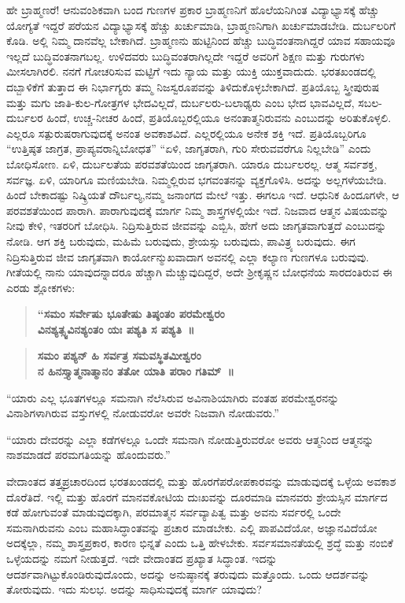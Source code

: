 ಹೇ ಬ್ರಾಹ್ಮಣರೆ! ಆನುವಂಶಿಕವಾಗಿ ಬಂದ ಗುಣಗಳ ಪ್ರಕಾರ ಬ್ರಾಹ್ಮಣನಿಗೆ ಹೊಲೆಯನಿಗಿಂತ ವಿದ್ಯಾಭ್ಯಾಸಕ್ಕೆ ಹೆಚ್ಚು ಯೋಗ್ಯತೆ ಇದ್ದರೆ ಪರೆಯನ ವಿದ್ಯಾಭ್ಯಾಸಕ್ಕೆ ಹೆಚ್ಚು ಖರ್ಚುಮಾಡಿ, ಬ್ರಾಹ್ಮಣನಿಗಾಗಿ ಖರ್ಚುಮಾಡಬೇಡಿ. ದುರ್ಬಲರಿಗೆ ಕೊಡಿ. ಅಲ್ಲಿ ನಿಮ್ಮ ದಾನವೆಲ್ಲ ಬೇಕಾಗಿದೆ. ಬ್ರಾಹ್ಮಣನು ಹುಟ್ಟಿನಿಂದ ಹೆಚ್ಚು ಬುದ್ಧಿವಂತನಾಗಿದ್ದರೆ ಯಾವ ಸಹಾಯವೂ ಇಲ್ಲದೆ ಬುದ್ಧಿವಂತನಾಗಬಲ್ಲ. ಉಳಿದವರು ಬುದ್ಧಿವಂತರಾಗಿಲ್ಲದೇ ಇದ್ದರೆ ಅವರಿಗೆ ಶಿಕ್ಷಣ ಮತ್ತು ಗುರುಗಳು ಮೀಸಲಾಗಿರಲಿ. ನನಗೆ ಗೋಚರಿಸುವ ಮಟ್ಟಿಗೆ ಇದು ನ್ಯಾಯ ಮತ್ತು ಯುಕ್ತಿ ಯುಕ್ತವಾದುದು. ಭರತಖಂಡದಲ್ಲಿ ದಬ್ಬಾಳಿಕೆಗೆ ತುತ್ತಾದ ಈ ನಿರ್ಭಾಗ್ಯರು ತಮ್ಮ ನಿಜಸ್ವರೂಪವನ್ನು ತಿಳಿದುಕೊಳ್ಳಬೇಕಾಗಿದೆ. ಪ್ರತಿಯೊಬ್ಬ ಸ್ತ್ರೀಪುರುಷ ಮತ್ತು ಮಗು ಜಾತಿ-ಕುಲ-ಗೋತ್ರಗಳ ಭೇದವಿಲ್ಲದೆ, ದುರ್ಬಲರು-ಬಲಾಢ್ಯರು ಎಂಬ ಭೇದ ಭಾವವಿಲ್ಲದೆ, ಸಬಲ-ದುರ್ಬಲರ ಹಿಂದೆ, ಉಚ್ಚ-ನೀಚರ ಹಿಂದೆ, ಪ್ರತಿಯೊಬ್ಬರಲ್ಲಿಯೂ ಅನಂತಾತ್ಮನಿರುವನು ಎಂಬುದನ್ನು ಅರಿತುಕೊಳ್ಳಲಿ. ಎಲ್ಲರೂ ಸತ್ಪುರುಷರಾಗುವುದಕ್ಕೆ ಅನಂತ ಅವಕಾಶವಿದೆ. ಎಲ್ಲರಲ್ಲಿಯೂ ಅನೇಕ ಶಕ್ತಿ ಇದೆ. ಪ್ರತಿಯೊಬ್ಬರಿಗೂ “ಉತ್ತಿಷ್ಠತ ಜಾಗ್ರತ, ಪ್ರಾಪ್ಯವರಾನ್ನಿಬೋಧತ” “ಏಳಿ, ಜಾಗೃತರಾಗಿ, ಗುರಿ ಸೇರುವವರೆಗೂ ನಿಲ್ಲಬೇಡಿ” ಎಂದು ಬೋಧಿಸೋಣ. ಏಳಿ, ದುರ್ಬಲತೆಯ ಪರವಶತೆಯಿಂದ ಜಾಗೃತರಾಗಿ. ಯಾರೂ ದುರ್ಬಲರಲ್ಲ. ಆತ್ಮ ಸರ್ವಶಕ್ತ, ಸರ್ವಜ್ಞ. ಏಳಿ, ಯಾರಿಗೂ ಮಣಿಯಬೇಡಿ. ನಿಮ್ಮಲ್ಲಿರುವ ಭಗವಂತನನ್ನು ವ್ಯಕ್ತಗೊಳಿಸಿ. ಅದನ್ನು ಅಲ್ಲಗಳೆಯಬೇಡಿ. ಹಿಂದೆ ಬೇಕಾದಷ್ಟು ನಿಷ್ಕ್ರಿಯತೆ ದೌರ್ಬಲ್ಯ,\break ನಮ್ಮ ಜನಾಂಗದ ಮೇಲೆ ಇತ್ತು. ಈಗಲೂ ಇದೆ. ಆಧುನಿಕ ಹಿಂದೂಗಳೇ, ಆ ಪರವಶತೆಯಿಂದ ಪಾರಾಗಿ. ಪಾರಾಗುವುದಕ್ಕೆ ಮಾರ್ಗ ನಿಮ್ಮ ಶಾಸ್ತ್ರಗಳಲ್ಲಿಯೇ ಇದೆ. ನಿಜವಾದ ಆತ್ಮನ ವಿಷಯವನ್ನು ನೀವು ಕೇಳಿ, ಇತರರಿಗೆ ಬೋಧಿಸಿ. ನಿದ್ರಿಸುತ್ತಿರುವ ಜೀವವನ್ನು ಎಬ್ಬಿಸಿ, ಹೇಗೆ ಅದು ಜಾಗೃತವಾಗುತ್ತದೆ ಎಂಬುದನ್ನು ನೋಡಿ. ಆಗ ಶಕ್ತಿ ಬರುವುದು, ಮಹಿಮೆ ಬರುವುದು, ಶ್ರೇಯಸ್ಸು ಬರುವುದು, ಪಾವಿತ್ರ್ಯ ಬರುವುದು. ಈಗ ನಿದ್ರಿಸುತ್ತಿರುವ ಜೀವ ಜಾಗೃತವಾಗಿ ಕಾರ್ಯೋನ್ಮುಖವಾದಾಗ ಅವನಲ್ಲಿ ಎಲ್ಲಾ ಕಲ್ಯಾಣ ಗುಣಗಳೂ ಬರುವುವು. ಗೀತೆಯಲ್ಲಿ ನಾನು ಯಾವುದನ್ನಾದರೂ ಹೆಚ್ಚಾಗಿ ಮೆಚ್ಚುವುದಿದ್ದರೆ, ಅದೇ ಶ‍್ರೀಕೃಷ್ಣನ ಬೋಧನೆಯ ಸಾರದಂತಿರುವ ಈ ಎರಡು ಶ್ಲೋಕಗಳು:

\begin{verse}
\textbf{“ಸಮಂ ಸರ್ವೇಷು ಭೂತೇಷು ತಿಷ್ಠಂತಂ ಪರಮೇಶ್ವರಂ}\\\textbf{ವಿನಶ್ಯತ್ಸ್ವವಿನಶ್ಯಂತಂ ಯಃ ಪಶ್ಯತಿ ಸ ಪಶ್ಯತಿ~॥}
\end{verse}

\begin{verse}
\textbf{ಸಮಂ ಪಶ್ಯನ್​ ಹಿ ಸರ್ವತ್ರ ಸಮವಸ್ಥಿತಮೀಶ್ವರಂ}\\\textbf{ನ ಹಿನಸ್ತ್ಯಾತ್ಮನಾತ್ಮಾನಂ ತತೋ ಯಾತಿ ಪರಾಂ ಗತಿಮ್​~॥}
\end{verse}

“ಯಾರು ಎಲ್ಲ ಭೂತಗಳಲ್ಲೂ ಸಮನಾಗಿ ನೆಲೆಸಿರುವ ಅವಿನಾಶಿಯಾಗಿರು ವಂತಹ ಪರಮೇಶ್ವರನನ್ನು ವಿನಾಶಿಗಳಾಗಿರುವ ವಸ್ತುಗಳಲ್ಲಿ ನೋಡುವರೋ ಅವರೇ ನಿಜವಾಗಿ ನೋಡುವರು.”

“ಯಾರು ದೇವರನ್ನು ಎಲ್ಲಾ ಕಡೆಗಳಲ್ಲೂ ಒಂದೇ ಸಮನಾಗಿ ನೋಡುತ್ತಿರುವರೋ ಅವರು ಆತ್ಮನಿಂದ ಆತ್ಮನನ್ನು ನಾಶಮಾಡದೆ ಪರಮಗತಿಯನ್ನು ಹೊಂದುವರು.”

ವೇದಾಂತದ ತತ್ತ್ವಪ್ರಚಾರದಿಂದ ಭರತಖಂಡದಲ್ಲಿ ಮತ್ತು ಹೊರಗೆ\break ಪರೋಪಕಾರವನ್ನು ಮಾಡುವುದಕ್ಕೆ ಒಳ್ಳೆಯ ಅವಕಾಶ ದೊರೆತಿದೆ. ಇಲ್ಲಿ ಮತ್ತು ಹೊರಗೆ ಮಾನವಕೋಟಿಯ ದುಃಖವನ್ನು ದೂರಮಾಡಿ ಮಾನವರು ಶ್ರೇಯಸ್ಸಿನ ಮಾರ್ಗದ ಕಡೆ ಹೋಗುವಂತೆ ಮಾಡುವುದಕ್ಕಾಗಿ, ಪರಮಾತ್ಮನ ಸರ್ವವ್ಯಾಪಿತ್ವ ಮತ್ತು ಅವನು ಸರ್ವರಲ್ಲಿ ಒಂದೇ ಸಮನಾಗಿರುವನು ಎಂಬ ಮಹಾಸಿದ್ಧಾಂತವನ್ನು ಪ್ರಚಾರ ಮಾಡಬೇಕು. ಎಲ್ಲಿ ಪಾಪವಿದೆಯೋ, ಅಜ್ಞಾನವಿದೆಯೋ ಅದಕ್ಕೆಲ್ಲಾ, ನಮ್ಮ ಶಾಸ್ತ್ರಪ್ರಕಾರ, ಕಾರಣ ಭಿನ್ನತೆ ಎಂದು ಒತ್ತಿ ಹೇಳಬೇಕು. ಸರ್ವಸಮಾನತೆಯಲ್ಲಿ ಶ್ರದ್ಧೆ ಮತ್ತು ನಂಬಿಕೆ ಒಳ್ಳೆಯದನ್ನು ನಮಗೆ ನೀಡುತ್ತದೆ. ಇದೇ ವೇದಾಂತದ ಪ್ರಖ್ಯಾತ ಸಿದ್ಧಾಂತ. ಇದನ್ನು ಆದರ್ಶವಾಗಿಟ್ಟುಕೊಂಡಿರುವುದೊಂದು, ಅದನ್ನು ಅನುಷ್ಠಾನಕ್ಕೆ ತರುವುದು ಮತ್ತೊಂದು. ಒಂದು ಆದರ್ಶವನ್ನು ತೋರುವುದು. ಇದು ಸುಲಭ. ಅದನ್ನು ಸಾಧಿಸುವುದಕ್ಕೆ ಮಾರ್ಗ ಯಾವುದು?

